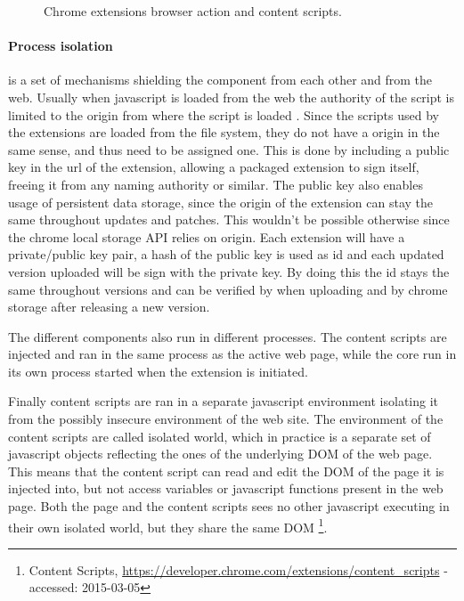 \begin{figure}[h]
    \caption{Chrome extensions browser action and content scripts.}
    \label{extension-ux}
\end{figure}

\paragraph{Process isolation} is a set of mechanisms shielding the component from each other and from the web. Usually when javascript is loaded from the web the authority of the script is limited to the origin from where the script is loaded \cite{protecting-browsers}. Since the scripts used by the extensions are loaded from the file system, they do not have a origin in the same sense, and thus need to be assigned one. This is done by including a public key in the url of the extension, allowing a packaged extension to sign itself, freeing it from any naming authority or similar. The public key also enables usage of persistent data storage, since the origin of the extension can stay the same throughout updates and patches. This wouldn't be possible otherwise since the chrome local storage API relies on origin. Each extension will have a private/public key pair, a hash of the public key is used as id and each updated version uploaded will be sign with the private key. By doing this the id stays the same throughout versions and can be verified by when uploading and by chrome storage after releasing a new version. 


\par The different components also run in different processes. The content scripts are injected and ran in the same process as the active web page, while the core run in its own process started when the extension is initiated. 
\par Finally content scripts are ran in a separate javascript environment isolating it from the possibly insecure environment of the web site. The environment of the content scripts are called isolated world, which in practice is a separate set of javascript objects reflecting the ones of the underlying DOM of the web page. This means that the content script can read and edit the DOM of the page it is injected into, but not access variables or javascript functions present in the web page. Both the page and the content scripts sees no other javascript executing in their own isolated world, but they share the same DOM \footnote{Content Scripts, \url{https://developer.chrome.com/extensions/content_scripts} - accessed: 2015-03-05}.


